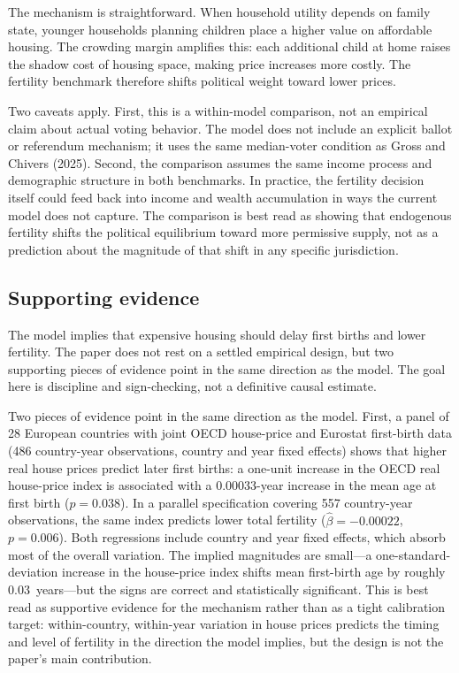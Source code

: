 The mechanism is straightforward. When household utility depends on family state, younger
households planning children place a higher value on affordable housing. The crowding
margin amplifies this: each additional child at home raises the shadow cost of housing
space, making price increases more costly. The fertility benchmark therefore shifts
political weight toward lower prices.

Two caveats apply. First, this is a within-model comparison, not an empirical claim about
actual voting behavior. The model does not include an explicit ballot or referendum
mechanism; it uses the same median-voter condition as Gross and Chivers (2025). Second, the
comparison assumes the same income process and demographic structure in both benchmarks. In
practice, the fertility decision itself could feed back into income and wealth accumulation
in ways the current model does not capture. The comparison is best read as showing that
endogenous fertility shifts the political equilibrium toward more permissive supply, not as
a prediction about the magnitude of that shift in any specific jurisdiction.

\subsection{Supporting evidence}
\label{sub:evidence}

The model implies that expensive housing should delay first births and lower fertility. The
paper does not rest on a settled empirical design, but two supporting pieces of evidence
point in the same direction as the model. The goal here is discipline and sign-checking, not
a definitive causal estimate.

Two pieces of evidence point in the same direction as the model. First, a panel of 28
European countries with joint OECD house-price and Eurostat first-birth data (486
country-year observations, country and year fixed effects) shows that higher real house
prices predict later first births: a one-unit increase in the OECD real house-price index
is associated with a 0.00033-year increase in the mean age at first birth ($p = 0.038$).
In a parallel specification covering 557 country-year observations, the same index predicts
lower total fertility ($\hat{\beta} = -0.00022$, $p = 0.006$). Both regressions include
country and year fixed effects, which absorb most of the overall variation. The implied
magnitudes are
small---a one-standard-deviation increase in the house-price index shifts mean first-birth
age by roughly 0.03~years---but the signs are correct and statistically significant. This
is best read as supportive evidence for the mechanism rather than as a tight calibration
target: within-country, within-year variation in house prices predicts the timing and level
of fertility in the direction the model implies, but the design is not the paper's main
contribution.

